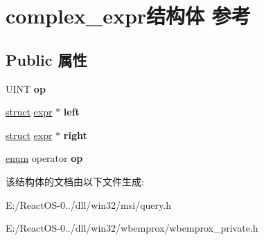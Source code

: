 \hypertarget{structcomplex__expr}{}\section{complex\+\_\+expr结构体 参考}
\label{structcomplex__expr}
\subsection*{Public 属性}
\begin{DoxyCompactItemize}
\item 
\mbox{\label{structcomplex__expr_a5488c492d45f70ca079b3909949c14ae}} 
U\+I\+NT {\bfseries op}
\item 
\mbox{\label{structcomplex__expr_a6431ead996f4f129c16fc8dfcb0aab2a}} 
\hyperlink{interfacestruct}{struct} \hyperlink{structexpr}{expr} $\ast$ {\bfseries left}
\item 
\mbox{\label{structcomplex__expr_aba6743602fa384c50604538a3ee87f7f}} 
\hyperlink{interfacestruct}{struct} \hyperlink{structexpr}{expr} $\ast$ {\bfseries right}
\item 
\mbox{\label{structcomplex__expr_a821988f940938340e0a4a1f1868a68ab}} 
\hyperlink{interfaceenum}{enum} operator {\bfseries op}
\end{DoxyCompactItemize}


该结构体的文档由以下文件生成\+:\begin{DoxyCompactItemize}
\item 
E\+:/\+React\+O\+S-\/0../dll/win32/msi/query.\+h\item 
E\+:/\+React\+O\+S-\/0../dll/win32/wbemprox/wbemprox\+\_\+private.\+h\end{DoxyCompactItemize}
